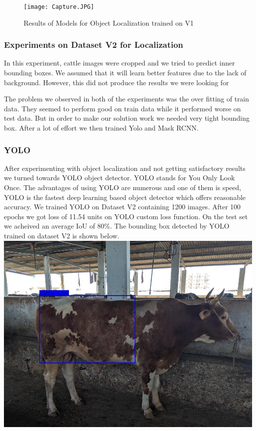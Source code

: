 \begin{figure}[h]
\centering
\texttt{[image: Capture.JPG]}
\caption{Results of Models for Object Localization trained on V1}
\end{figure}
\pagebreak



\subsubsection{Experiments on Dataset V2 for Localization}
In this experiment, cattle images were cropped and we tried to predict inner bounding boxes. We assumed that it will learn better features due to the lack of background. However, this did not produce the results we were looking for

The problem we observed in both of the experiments was the over fitting of train data. They seemed to perform good on train data while it performed worse on test data. But in order to make our solution work we needed very tight bounding box. After a lot of effort we then trained Yolo and Mask RCNN. 

\subsubsection{YOLO}
After experimenting with object localization and not getting satisfactory results we turned towards YOLO object detector. YOLO stands for You Only Look Once. The advantages of using YOLO are numerous and one of them is speed, YOLO is the fastest deep learning based object detector which offers reasonable accuracy.
We trained YOLO on Dataset V2 containing 1200 images. After 100 epochs we got loss of 11.54 units on YOLO custom loss function.
On the test set we acheived an average IoU of \(80\%\).
The bounding box detected by YOLO trained on dataset V2 is shown below.\\
\includegraphics[scale = 0.2]{images/result.jpg}


